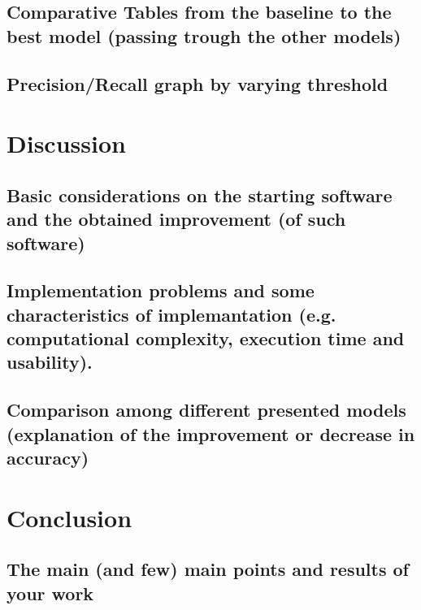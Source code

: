 \documentclass[a4paper,12pt,oneside]{article}
\begin{document}
\subsection{Comparative Tables from the baseline to the best model (passing trough the other models)}

\subsection {Precision/Recall graph by varying threshold}

\section {Discussion}

\subsection {Basic considerations on the starting software and the obtained improvement (of such software)}

\subsection {Implementation problems and some characteristics of implemantation (e.g. computational complexity, execution time and usability).}

\subsection {Comparison among different presented models  (explanation of the improvement or decrease in accuracy)}

\section {Conclusion}

\subsection {The  main  (and few) main points and results of your work}

 
\end{document}
